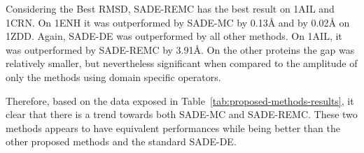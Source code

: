 Considering the Best \ac{RMSD}, SADE-REMC has the best result on 1AIL and 1CRN. On 1ENH it was
outperformed by SADE-MC by 0.13{\AA} and by 0.02{\AA} on 1ZDD. Again, SADE-DE was outperformed
by all other methods. On 1AIL, it was outperformed by SADE-REMC by 3.91{\AA}. On the other proteins
the gap was relatively smaller, but nevertheless significant when compared to the amplitude
of only the methods using domain specific operators. 



Therefore, based on the data exposed in Table~\ref{tab:proposed-methods-results}, it clear that there is 
a trend towards both SADE-MC and SADE-REMC. These two methods appears to have equivalent performances while
being better than the other proposed methods and the standard SADE-DE. 



